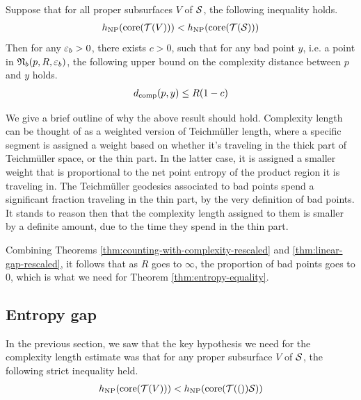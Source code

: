 \documentclass[12pt, reqno]{amsart}
\begin{document}
\begin{theorem}
  \label{thm:linear-gap-rescaled}
  Suppose that for all proper subsurfaces $V$ of $\mathcal{S}$, the following inequality holds.
  \begin{align*}
    h_{\mathrm{NP}}(\mathrm{core}(\mathcal{T}(V))) < h_{\mathrm{NP}}(\mathrm{core}(\mathcal{T}(\mathcal{S})))
  \end{align*}
  Then for any $\varepsilon_b >0$, there exists $c > 0$, such that for any bad point $y$, i.e. a point in $\mathfrak{N}_b(p, R, \varepsilon_b)$, the following upper bound on the complexity distance between $p$ and $y$ holds.
  \begin{align*}
    d_{\mathrm{comp}}(p, y) \leq R(1 - c)
  \end{align*}
\end{theorem}
\begin{rem}
  We give a brief outline of why the above result should hold.
  Complexity length can be thought of as a weighted version of Teichmüller length, where a specific segment is assigned a weight based on whether it's traveling in the thick part of Teichmüller space, or the thin part.
  In the latter case, it is assigned a smaller weight that is proportional to the net point entropy of the product region it is traveling in.
  The Teichmüller geodesics associated to bad points spend a significant fraction traveling in the thin part, by the very definition of bad points.
  It stands to reason then that the complexity length assigned to them is smaller by a definite amount, due to the time they spend in the thin part.
\end{rem}

Combining Theorems \ref{thm:counting-with-complexity-rescaled} and \ref{thm:linear-gap-rescaled}, it follows that as $R$ goes to $\infty$, the proportion of bad points goes to $0$, which is what we need for Theorem \ref{thm:entropy-equality}.

\subsection{Entropy gap}
\label{sec:entr-gap-cons}

In the previous section, we saw that the key hypothesis we need for the complexity length estimate was that for any proper subsurface $V$ of $\mathcal{S}$, the following strict inequality held.
\begin{align}
  \label{eq:net-point-entropy-gap}
  h_{\mathrm{NP}}(\mathrm{core}(\mathcal{T}(V))) < h_{\mathrm{NP}}(\mathrm{core}(\mathcal{T}(())\mathcal{S}))
\end{align}
\end{document}
